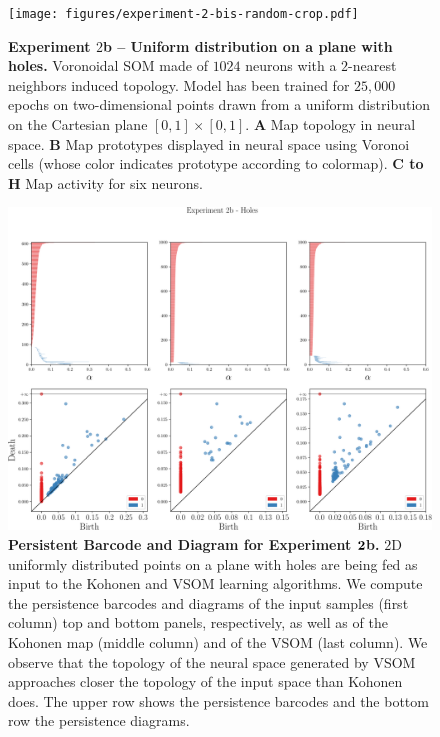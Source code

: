 \begin{figure}[!htpb]
     \centering
     \texttt{[image: figures/experiment-2-bis-random-crop.pdf]}
     \caption{{\bfseries \sffamily Experiment $2$b -- Uniform distribution on a plane with holes.}
     Voronoidal SOM made of $1024$ neurons with a $2$-nearest neighbors
     induced topology. Model has been trained for $25,000$ epochs on two-dimensional
     points drawn from a uniform distribution on the Cartesian plane $[0, 1] \times [0, 1]$. 
     \textbf{A} Map topology in neural space. \textbf{B} Map prototypes displayed 
     in neural space using Voronoi cells (whose color indicates prototype according 
     to colormap). \textbf{C to H} Map activity for six neurons.}
     \label{Fig:experiment2b}
\end{figure}

\begin{figure}[!htpb]
     \centering
     \includegraphics[width=\textwidth]{figures/experiment-2-bis-pd.pdf}
     \caption{{\bfseries \sffamily Persistent Barcode and Diagram for 
     Experiment ${\bf 2}$b.} $2$D uniformly distributed points on a plane with holes 
     are being fed as input to the Kohonen and VSOM learning algorithms. We compute 
     the persistence barcodes and diagrams of the input samples (first column) top and 
     bottom panels, respectively, as well as of the Kohonen map (middle column) and of
     the VSOM (last column). 
     We observe that the topology of the neural space generated by VSOM approaches closer
     the topology of the input space than Kohonen does. The upper row shows the persistence
     barcodes and the bottom row the persistence diagrams. }
     \label{Fig:persistence_exp2b}
\end{figure}


